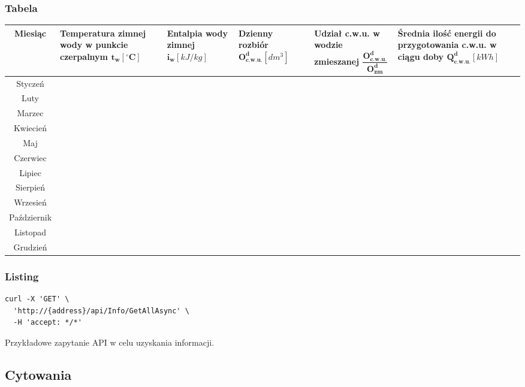 \documentclass[11pt,a4paper]{article}
\begin{document}
\subsubsection{Tabela}
\begin{table}[H]
\centering
\begin{tabularx}{\textwidth}{|c|X|X|X|X|X|}
\hline
Miesiąc & Temperatura zimnej wody w punkcie czerpalnym \(\boldsymbol{t_w}\left[ \boldsymbol{^\circ C} \right]\) 
& Entalpia wody zimnej \(\boldsymbol{i_w}\left[kJ/kg\right]\) 
& Dzienny rozbiór \(\boldsymbol{O^{d}_{c.w.u.}} \left[dm^3\right]\) 
& Udział c.w.u. w wodzie zmieszanej \(\dfrac{\boldsymbol{O^{d}_{c.w.u.}}}{\boldsymbol{O^{d}_{zm}}}\) 
& Średnia ilość energii do przygotowania c.w.u. w ciągu doby \(\boldsymbol{Q^{d}_{c.w.u.}} \left[kWh\right]\) \\

\hline
Styczeń     &  &  &  &  &  \\
\hline
Luty        &  &  &  &  &  \\
\hline
Marzec      &  &  &  &  &  \\
\hline
Kwiecień    &  &  &  &  &  \\
\hline
Maj         &  &  &  &  &  \\
\hline
Czerwiec    &  &  &  &  &  \\
\hline
Lipiec      &  &  &  &  &  \\
\hline
Sierpień    &  &  &  &  &  \\
\hline
Wrzesień    &  &  &  &  &  \\
\hline
Październik &  &  &  &  &  \\
\hline
Listopad    &  &  &  &  &  \\
\hline
Grudzień    &  &  &  &  &  \\
\hline
\end{tabularx}
\end{table}

\subsubsection{Listing}
\begin{listing}[H]
\begin{verbatim}
curl -X 'GET' \
  'http://{address}/api/Info/GetAllAsync' \
  -H 'accept: */*'
\end{verbatim}
\caption{Przykładowe zapytanie API w celu uzyskania informacji.}
\label{listing:get-all-req}
\end{listing}

\subsection{Cytowania}
\end{document}

